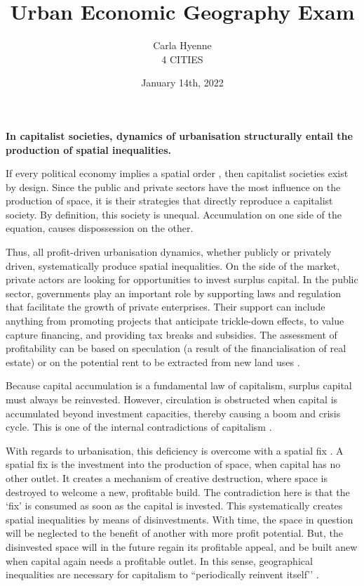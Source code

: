 \documentclass[12pt]{article}
\title{Urban Economic Geography Exam}
\author{Carla Hyenne\\[3ex]4 CITIES}
\date{January 14th, 2022}
\begin{document}
\maketitle

\pagebreak
\singlespacing

\textbf{In capitalist societies, dynamics of urbanisation structurally entail the production of spatial inequalities.}

If every political economy implies a spatial order \parencite{lefebvre2009state}, then capitalist societies exist by design. Since the public and private sectors have the most influence on the production of space, it is their strategies that directly reproduce a capitalist society. By definition, this society is unequal. Accumulation on one side of the equation, causes dispossession on the other.

Thus, all profit-driven urbanisation dynamics, whether publicly or privately driven, systematically produce spatial inequalities. 
On the side of the market, private actors are looking for opportunities to invest surplus capital. In the public sector, governments play an important role by supporting laws and regulation that facilitate the growth of private enterprises. Their support can include anything from promoting projects that anticipate trickle-down effects, to value capture financing, and providing tax breaks and subsidies.
The assessment of profitability can be based on speculation (a result of the financialisation of real estate) or on the potential rent to be extracted from new land uses \parencite{smith1979toward}.

Because capital accumulation is a fundamental law of capitalism, surplus capital must always be reinvested. However, circulation is obstructed when capital is accumulated beyond investment capacities, thereby causing a boom and crisis cycle. This is one of the internal contradictions of capitalism \parencite{harvey2014seventeen}.

With regards to urbanisation, this deficiency is overcome with a spatial fix \parencite{harvey2001globalization}.
A spatial fix is the investment into the production of space, when capital has no other outlet. 
It creates a mechanism of creative destruction, where space is destroyed to welcome a new, profitable build.
The contradiction here is that the `fix' is consumed as soon as the capital is invested. This systematically creates spatial inequalities by means of disinvestments. With time, the space in question will be neglected to the benefit of another with more profit potential. But, the disinvested space will in the future regain its profitable appeal, and be built anew when capital again needs a profitable outlet.
In this sense, geographical inequalities are necessary for capitalism to ``periodically reinvent itself’’ \parencite[p.157]{harvey2014seventeen}.
\end{document}
